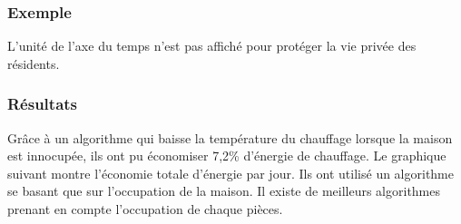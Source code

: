 \begin{frame}
 \frametitle{Exemple}
 L'unité de l'axe du temps n'est pas affiché pour protéger la vie privée des résidents.
\end{frame}

\begin{frame}
 \frametitle{Résultats}
 Grâce à un algorithme qui baisse la température du chauffage lorsque la maison est innocupée, ils ont pu économiser 7,2\% d'énergie de chauffage.
 Le graphique suivant montre l'économie totale d'énergie par jour.
 Ils ont utilisé un algorithme se basant que sur l'occupation de la maison. Il existe de meilleurs algorithmes prenant en compte l'occupation de chaque pièces.
\end{frame}

 
 